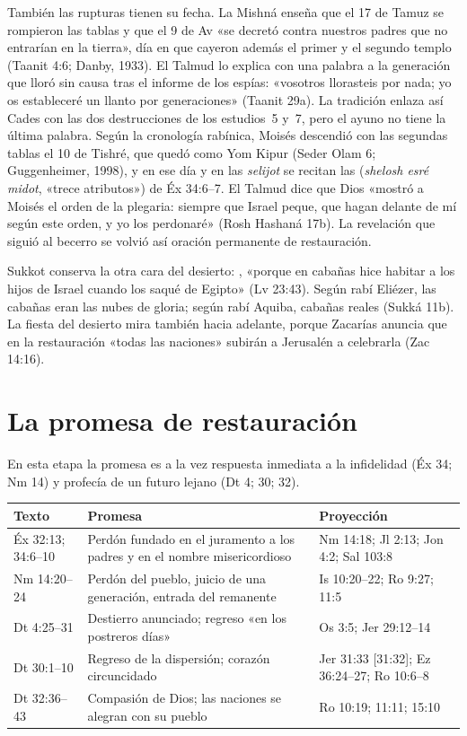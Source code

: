 También las rupturas tienen su fecha. La Mishná enseña que el 17 de Tamuz se rompieron las tablas y que el 9 de Av «se decretó contra nuestros padres que no entrarían en la tierra», día en que cayeron además el primer y el segundo templo (Taanit 4:6; Danby, 1933). El Talmud lo explica con una palabra a la generación que lloró sin causa tras el informe de los espías: «vosotros llorasteis por nada; yo os estableceré un llanto por generaciones» (Taanit 29a). La tradición enlaza así Cades con las dos destrucciones de los estudios~5 y~7, pero el ayuno no tiene la última palabra. Según la cronología rabínica, Moisés descendió con las segundas tablas el 10 de Tishré, que quedó como Yom Kipur (Seder Olam 6; Guggenheimer, 1998), y en ese día y en las \emph{selijot} se recitan las  (\emph{shelosh esré midot}, «trece atributos») de Éx 34:6–7. El Talmud dice que Dios «mostró a Moisés el orden de la plegaria: siempre que Israel peque, que hagan delante de mí según este orden, y yo los perdonaré» (Rosh Hashaná 17b). La revelación que siguió al becerro se volvió así oración permanente de restauración.

Sukkot conserva la otra cara del desierto: , «porque en cabañas hice habitar a los hijos de Israel cuando los saqué de Egipto» (Lv 23:43). Según rabí Eliézer, las cabañas eran las nubes de gloria; según rabí Aquiba, cabañas reales (Sukká 11b). La fiesta del desierto mira también hacia adelante, porque Zacarías anuncia que en la restauración «todas las naciones» subirán a Jerusalén a celebrarla (Zac 14:16).

\section{La promesa de restauración}\label{sec:resto}

En esta etapa la promesa es a la vez respuesta inmediata a la infidelidad (Éx 34; Nm 14) y profecía de un futuro lejano (Dt 4; 30; 32).

\begin{center}\small
\renewcommand{\arraystretch}{1.2}
\begin{tabular}{>{\RaggedRight\arraybackslash}p{2.5cm}>{\RaggedRight\arraybackslash}p{5.4cm}>{\RaggedRight\arraybackslash}p{6.0cm}}
\toprule
\textbf{Texto} & \textbf{Promesa} & \textbf{Proyección}\\
\midrule
Éx 32:13; 34:6–10 & Perdón fundado en el juramento a los padres y en el nombre misericordioso & Nm 14:18; Jl 2:13; Jon 4:2; Sal 103:8\\
Nm 14:20–24 & Perdón del pueblo, juicio de una generación, entrada del remanente & Is 10:20–22; Ro 9:27; 11:5\\
Dt 4:25–31 & Destierro anunciado; regreso «en los postreros días» & Os 3:5; Jer 29:12–14\\
Dt 30:1–10 & Regreso de la dispersión; corazón circuncidado & Jer 31:33 [31:32]; Ez 36:24–27; Ro 10:6–8\\
Dt 32:36–43 & Compasión de Dios; las naciones se alegran con su pueblo & Ro 10:19; 11:11; 15:10\\
\bottomrule
\end{tabular}\end{center}

